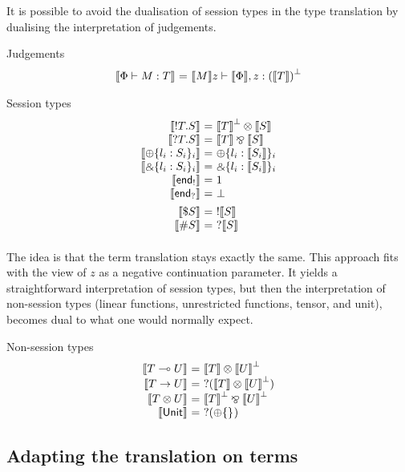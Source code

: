 \documentclass{easychair}
\makeatletter
\newcommand{\ba}{\begin{array}}
\newcommand{\ea}{\end{array}}
\newenvironment{equations}{\[\ba{@{}r@{~}c@{~}l@{}}}{\ea\]}
\newcommand{\key}{\mathsf}
\newcommand{\set}[1]{\{ #1 \}}
\newcommand{\gvtocp}[1]{\llbracket{#1}\rrbracket}
\newcommand{\row}[2]{\set{#1}_{#2}}
\newcommand{\gvOutput}[2]{!{#1}.{#2}}
\newcommand{\gvInput}[2]{?{#1}.{#2}}
\newcommand{\gvEndOutput}{\key{end}_!}
\newcommand{\gvEndInput}{\key{end}_?}
\newcommand{\gvPlus}[2]{\oplus \row{#1}{#2}}
\newcommand{\gvChoice}[2]{\binampersand \row{#1}{#2}}
\newcommand{\gvServer}[1]{\${#1}}
\newcommand{\gvService}[1]{\#{#1}}
\newcommand{\cpj}[2]{{#1} \vdash {#2}}
\newcommand{\gvj}[3]{{#1} \vdash {#2} : {#3}}
\newcommand{\la}{l}
\newcommand{\lolli}{\multimap}
\newcommand{\gvLinFun}[2]{{#1} \lolli {#2}}
\newcommand{\gvUnFun}[2]{{#1} \to {#2}}
\newcommand{\gvTimes}[2]{{#1} \otimes {#2}}
\newcommand{\gvUnitType}{\key{Unit}}
\newcommand{\cpTimes}[2]{{#1} \otimes {#2}}
\newcommand{\cpPar}[2]{{#1} \mathbin{\bindnasrepma} {#2}}
\newcommand{\cpPlus}[2]{\oplus \row{#1}{#2}}
\newcommand{\cpWith}[2]{\binampersand \row{#1}{#2}}
\newcommand{\cpOne}{1}
\newcommand{\cpBottom}{\bot}
\newcommand{\cpOfCourse}[1]{!{#1}}
\newcommand{\cpWhyNot}[1]{?{#1}}
\newcommand{\cpDual}[1]{{#1}^\bot}
\newcommand{\gvtocps}[1]{\gvtocp{#1}}
\makeatother
\begin{document}
It is possible to avoid the dualisation of session types in the type
translation by dualising the interpretation of judgements.

Judgements
\begin{equations}
\gvtocps{\gvj{\Phi}{M}{T}} &=& \cpj{\gvtocp{M} z}{\gvtocps{\Phi}, z:\cpDual{(\gvtocps{T})}}
\end{equations}

Session types
\begin{equations}
\gvtocps{\gvOutput{T}{S}}        &=& \cpTimes{\cpDual{\gvtocps{T}}}{\gvtocps{S}} \\
\gvtocps{\gvInput{T}{S}}         &=& \cpPar{\gvtocps{T}}{\gvtocps{S}} \\
\gvtocps{\gvPlus{\la_i:S_i}{i}}   &=& \cpPlus{\la_i:\gvtocps{S_i}}{i} \\
\gvtocps{\gvChoice{\la_i:S_i}{i}} &=& \cpWith{\la_i:\gvtocps{S_i}}{i} \\
\gvtocps{\gvEndOutput}              &=& \cpOne \\
\gvtocps{\gvEndInput}               &=& \cpBottom \\[1ex]

\gvtocps{\gvServer{S}}  &=& \cpOfCourse{\gvtocps{S}} \\
\gvtocps{\gvService{S}} &=& \cpWhyNot{\gvtocps{S}} \\[1ex]
\end{equations}


The idea is that the term translation stays exactly the same. This
approach fits with the view of $z$ as a negative continuation
parameter. It yields a straightforward interpretation of session
types, but then the interpretation of non-session types (linear
functions, unrestricted functions, tensor, and unit), becomes dual to
what one would normally expect.

Non-session types
\begin{equations}
\gvtocps{\gvLinFun{T}{U}} &=& \cpTimes{\gvtocp{T}}{\cpDual{\gvtocp{U}}} \\
\gvtocps{\gvUnFun{T}{U}} &=& \cpWhyNot{(\cpTimes{\gvtocp{T}}{\cpDual{\gvtocp{U}}})} \\
\gvtocps{\gvTimes{T}{U}} &=& \cpPar{\cpDual{\gvtocp{T}}}{\cpDual{\gvtocp{U}}} \\
\gvtocps{\gvUnitType} &=& \cpWhyNot{(\cpPlus{}{})} \\
\end{equations}

\subsection{Adapting the translation on terms}
\end{document}

